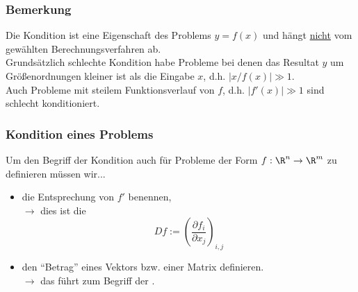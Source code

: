 %
\begin{frame}\frametitle{Bemerkung}
Die Kondition ist eine Eigenschaft des Problems $y=f(x)$ und hängt \underline{nicht} vom gewählten Berechnungsverfahren ab.\\\pause
\vfill
Grundsätzlich schlechte Kondition habe Probleme bei denen das Resultat $y$ um Größenordnungen kleiner ist als die Eingabe $x$, d.h. $\left| {x} /{f(x)} \right| \gg 1$.\\\pause Auch Probleme mit steilem Funktionsverlauf von $f$, d.h. $\left| f'(x) \right| \gg 1$ sind schlecht konditioniert.

\end{frame}
%
\begin{frame}\frametitle{Kondition eines Problems}
Um den Begriff der Kondition auch für Probleme der Form $f:\R^n \to \R^m$ zu definieren müssen wir...
\vfill
\begin{itemize}
\item die Entsprechung von $f'$ benennen,\\
\pause $\to$ dies ist die 
$$ 
Df:= \left(\frac{\partial f_i}{\partial x_j}\right)_{i,j}
$$
\pause
\item den ``Betrag'' eines Vektors bzw. einer Matrix definieren. \\
\pause $\to$ das führt zum Begriff der .
\end{itemize}
	
\end{frame}
%
